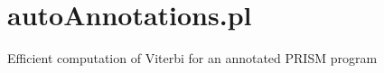 


\section{autoAnnotations.pl}

\label{sec:autoAnnotations}

\begin{description}
Efficient computation of Viterbi for an annotated PRISM program
\end{description}

